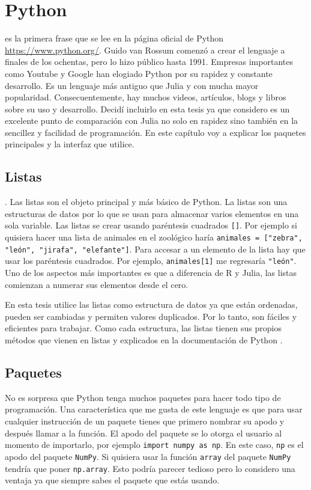 \chapter{Python}

 es la primera frase que se lee en la página oficial de Python \url{https://www.python.org/}.  Guido van Rossum comenzó a crear el lenguaje a finales de los ochentas, pero lo hizo público hasta 1991. Empresas importantes como Youtube y Google han elogiado Python por su rapidez y constante desarrollo. Es un lenguaje más antiguo que Julia y con mucha mayor popularidad. Consecuentemente, hay muchos videos, artículos, blogs y libros sobre su uso y desarrollo. Decidí incluirlo en esta tesis ya que considero es un excelente punto de comparación con Julia no solo en rapidez sino también en la sencillez y facilidad de programación. En este capítulo voy a explicar los paquetes principales y la interfaz que utilice. 

\section{Listas}
 \citep{matthes2019python}. Las listas son el objeto principal y más básico de Python. La listas son una estructuras de datos por lo que se usan para almacenar varios elementos en una sola variable. Las listas se crear usando paréntesis cuadrados \texttt{[]}. Por ejemplo si quisiera hacer una lista de animales en el zoológico haría \texttt{animales = ["zebra", "león", "jirafa", "elefante"]}. Para accesar a un elemento de la lista hay que usar los paréntesis cuadrados. Por ejemplo, \texttt{animales[1]} me regresaría \texttt{"león"}. Uno de los aspectos más importantes es que a diferencia de R y Julia, las listas comienzan a numerar sus elementos desde el cero. 

En esta tesis utilice las listas como estructura de datos ya que están ordenadas, pueden ser cambiadas y permiten valores duplicados. Por lo tanto, son fáciles y eficientes para trabajar. Como cada estructura, las listas tienen sus propios métodos que vienen en listas y explicados en la documentación de Python \cite{doc_python}. 


\section{Paquetes}
No es sorpresa que Python tenga muchos paquetes para hacer todo tipo de programación. Una característica que me gusta de este lenguaje es que para usar cualquier instrucción de un paquete tienes que primero nombrar su apodo y después llamar a la función. El apodo del paquete se lo otorga el usuario al momento de importarlo, por ejemplo \texttt{import numpy as np}. En este caso, \texttt{np} es el apodo del paquete \texttt{NumPy}. Si quisiera usar la función \texttt{array} del paquete \texttt{NumPy} tendría que poner \texttt{np.array}. Esto podría parecer tedioso pero lo considero una ventaja ya que siempre sabes el paquete que estás usando. 

